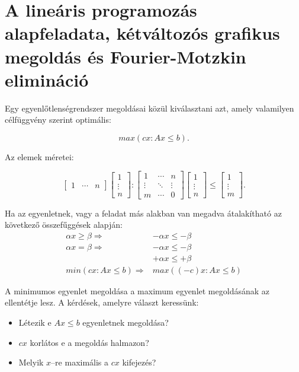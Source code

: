 ﻿\newpage
\section{A lineáris programozás alapfeladata, kétváltozós grafikus megoldás és Fourier-Motzkin elimináció}

Egy egyenlőtlenségrendszer megoldásai közül kiválasztani azt, amely valamilyen
célfüggvény szerint optimális:

\begin{displaymath}
max(cx: Ax \leq b).
\end{displaymath}

Az elemek méretei: 

\begin{displaymath}
\begin{bmatrix} 1 &  \cdots &  n \end{bmatrix}
\begin{bmatrix} 1 \\ \vdots \\  n \end{bmatrix}
:
\begin{bmatrix} 1 & \cdots & n \\ \vdots & \ddots & \vdots \\ m  & \cdots & 0 \end{bmatrix}
\begin{bmatrix} 1 \\ \vdots \\  n \end{bmatrix}
\leq
\begin{bmatrix} 1 \\ \vdots \\  m \end{bmatrix}.
\end{displaymath}

Ha az egyenletnek, vagy a feladat más alakban van megadva átalakítható az
következő összefűggések alapján:
\begin{align*}
\alpha x \geq \beta  \Rightarrow  &-\alpha x \leq -\beta \\
\alpha x  =    \beta \Rightarrow  & -\alpha x \leq-\beta \\
									 & +\alpha x \leq+\beta \\
min(cx:Ax \leq b)	 \Rightarrow    & max((-c)x:Ax \leq b)
\end{align*}

A minimumos egyenlet megoldása a maximum egyenlet megoldásának az ellentétje lesz.
A kérdések, amelyre választ keressünk:
\begin{itemize}
  \item Létezik e $Ax \leq b$ egyenletnek megoldása?
  \item $cx$ korlátos e a megoldás halmazon?
  \item Melyik $x$--re maximális a $cx$ kifejezés?
\end{itemize}

